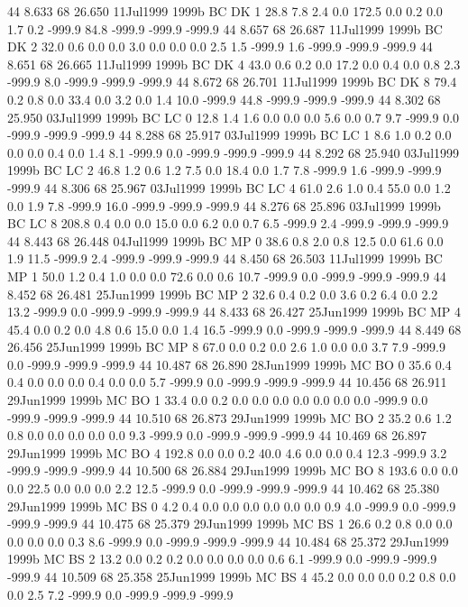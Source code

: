 44 8.633	68 26.650	11Jul1999	1999b	BC	DK	1	28.8	7.8	2.4	0.0	172.5	0.0	0.2	0.0	1.7	0.2	-999.9	84.8	-999.9	-999.9	-999.9
44 8.657	68 26.687	11Jul1999	1999b	BC	DK	2	32.0	0.6	0.0	0.0	3.0	0.0	0.0	0.0	2.5	1.5	-999.9	1.6	-999.9	-999.9	-999.9
44 8.651	68 26.665	11Jul1999	1999b	BC	DK	4	43.0	0.6	0.2	0.0	17.2	0.0	0.4	0.0	0.8	2.3	-999.9	8.0	-999.9	-999.9	-999.9
44 8.672	68 26.701	11Jul1999	1999b	BC	DK	8	79.4	0.2	0.8	0.0	33.4	0.0	3.2	0.0	1.4	10.0	-999.9	44.8	-999.9	-999.9	-999.9
44 8.302	68 25.950	03Jul1999	1999b	BC	LC	0	12.8	1.4	1.6	0.0	0.0	0.0	5.6	0.0	0.7	9.7	-999.9	0.0	-999.9	-999.9	-999.9
44 8.288	68 25.917	03Jul1999	1999b	BC	LC	1	8.6	1.0	0.2	0.0	0.0	0.0	0.4	0.0	1.4	8.1	-999.9	0.0	-999.9	-999.9	-999.9
44 8.292	68 25.940	03Jul1999	1999b	BC	LC	2	46.8	1.2	0.6	1.2	7.5	0.0	18.4	0.0	1.7	7.8	-999.9	1.6	-999.9	-999.9	-999.9
44 8.306	68 25.967	03Jul1999	1999b	BC	LC	4	61.0	2.6	1.0	0.4	55.0	0.0	1.2	0.0	1.9	7.8	-999.9	16.0	-999.9	-999.9	-999.9
44 8.276	68 25.896	03Jul1999	1999b	BC	LC	8	208.8	0.4	0.0	0.0	15.0	0.0	6.2	0.0	0.7	6.5	-999.9	2.4	-999.9	-999.9	-999.9
44 8.443	68 26.448	04Jul1999	1999b	BC	MP	0	38.6	0.8	2.0	0.8	12.5	0.0	61.6	0.0	1.9	11.5	-999.9	2.4	-999.9	-999.9	-999.9
44 8.450	68 26.503	11Jul1999	1999b	BC	MP	1	50.0	1.2	0.4	1.0	0.0	0.0	72.6	0.0	0.6	10.7	-999.9	0.0	-999.9	-999.9	-999.9
44 8.452	68 26.481	25Jun1999	1999b	BC	MP	2	32.6	0.4	0.2	0.0	3.6	0.2	6.4	0.0	2.2	13.2	-999.9	0.0	-999.9	-999.9	-999.9
44 8.433	68 26.427	25Jun1999	1999b	BC	MP	4	45.4	0.0	0.2	0.0	4.8	0.6	15.0	0.0	1.4	16.5	-999.9	0.0	-999.9	-999.9	-999.9
44 8.449	68 26.456	25Jun1999	1999b	BC	MP	8	67.0	0.0	0.2	0.0	2.6	1.0	0.0	0.0	3.7	7.9	-999.9	0.0	-999.9	-999.9	-999.9
44 10.487	68 26.890	28Jun1999	1999b	MC	BO	0	35.6	0.4	0.4	0.0	0.0	0.0	0.4	0.0	0.0	5.7	-999.9	0.0	-999.9	-999.9	-999.9
44 10.456	68 26.911	29Jun1999	1999b	MC	BO	1	33.4	0.0	0.2	0.0	0.0	0.0	0.0	0.0	0.0	0.0	-999.9	0.0	-999.9	-999.9	-999.9
44 10.510	68 26.873	29Jun1999	1999b	MC	BO	2	35.2	0.6	1.2	0.8	0.0	0.0	0.0	0.0	0.0	9.3	-999.9	0.0	-999.9	-999.9	-999.9
44 10.469	68 26.897	29Jun1999	1999b	MC	BO	4	192.8	0.0	0.0	0.2	40.0	4.6	0.0	0.0	0.4	12.3	-999.9	3.2	-999.9	-999.9	-999.9
44 10.500	68 26.884	29Jun1999	1999b	MC	BO	8	193.6	0.0	0.0	0.0	22.5	0.0	0.0	0.0	2.2	12.5	-999.9	0.0	-999.9	-999.9	-999.9
44 10.462	68 25.380	29Jun1999	1999b	MC	BS	0	4.2	0.4	0.0	0.0	0.0	0.0	0.0	0.0	0.9	4.0	-999.9	0.0	-999.9	-999.9	-999.9
44 10.475	68 25.379	29Jun1999	1999b	MC	BS	1	26.6	0.2	0.8	0.0	0.0	0.0	0.0	0.0	0.3	8.6	-999.9	0.0	-999.9	-999.9	-999.9
44 10.484	68 25.372	29Jun1999	1999b	MC	BS	2	13.2	0.0	0.2	0.2	0.0	0.0	0.0	0.0	0.6	6.1	-999.9	0.0	-999.9	-999.9	-999.9
44 10.509	68 25.358	25Jun1999	1999b	MC	BS	4	45.2	0.0	0.0	0.0	0.2	0.8	0.0	0.0	2.5	7.2	-999.9	0.0	-999.9	-999.9	-999.9

